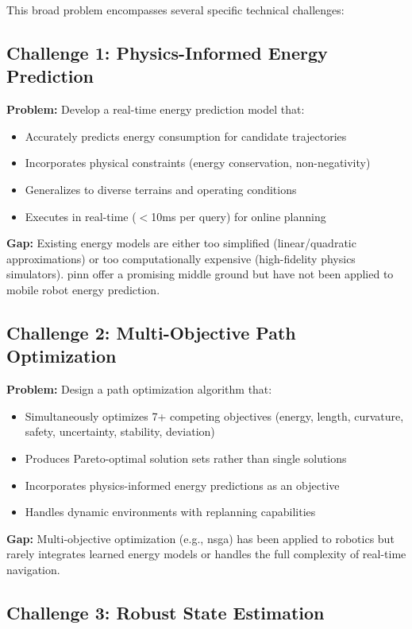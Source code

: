 This broad problem encompasses several specific technical challenges:

\subsection{Challenge 1: Physics-Informed Energy Prediction}

\textbf{Problem:} Develop a real-time energy prediction model that:
\begin{itemize}
    \item Accurately predicts energy consumption for candidate trajectories
    \item Incorporates physical constraints (energy conservation, non-negativity)
    \item Generalizes to diverse terrains and operating conditions
    \item Executes in real-time ($<$10ms per query) for online planning
\end{itemize}

\textbf{Gap:} Existing energy models are either too simplified (linear/quadratic approximations) or too computationally expensive (high-fidelity physics simulators). \acrfull{pinn} offer a promising middle ground but have not been applied to mobile robot energy prediction.

\subsection{Challenge 2: Multi-Objective Path Optimization}

\textbf{Problem:} Design a path optimization algorithm that:
\begin{itemize}
    \item Simultaneously optimizes 7+ competing objectives (energy, length, curvature, safety, uncertainty, stability, deviation)
    \item Produces Pareto-optimal solution sets rather than single solutions
    \item Incorporates physics-informed energy predictions as an objective
    \item Handles dynamic environments with replanning capabilities
\end{itemize}

\textbf{Gap:} Multi-objective optimization (e.g., \acrshort{nsga}) has been applied to robotics but rarely integrates learned energy models or handles the full complexity of real-time navigation.

\subsection{Challenge 3: Robust State Estimation}

